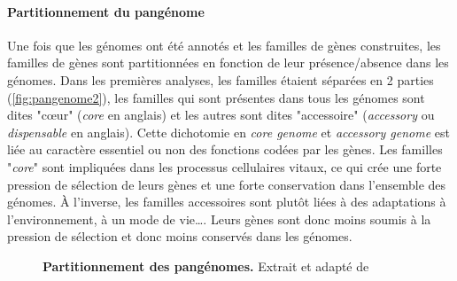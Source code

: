 \paragraph{Partitionnement du pangénome}

Une fois que les génomes ont été annotés et les familles de gènes construites, les familles de gènes sont partitionnées en fonction de leur présence/absence dans les génomes. Dans les premières analyses, les familles étaient séparées en 2 parties (\autoref{fig:pangenome2}), les familles qui sont présentes dans tous les génomes sont dites "c\oe ur" (\textit{core} en anglais) et les autres sont dites "accessoire" (\textit{accessory} ou \textit{dispensable} en anglais). Cette dichotomie en \textit{core genome} et \textit{accessory genome} est liée au caractère essentiel ou non des fonctions codées par les gènes. Les familles "\textit{core}" sont impliquées dans les processus cellulaires vitaux, ce qui crée une forte pression de sélection de leurs gènes et une forte conservation dans l'ensemble des génomes. À l'inverse, les familles accessoires sont plutôt liées à des adaptations à l'environnement, à un mode de vie\dots. Leurs gènes sont donc moins soumis à la pression de sélection et donc moins conservés dans les génomes.

\begin{figure}[htbp]
    \centering
    \hfill
    \caption[Partitionnement des pangénomes.]{\textbf{Partitionnement des pangénomes.} Extrait et adapté de \cite{gautreau_conceptualisation_2020}}
    \label{fig:pangenomeVenn}
\end{figure}

